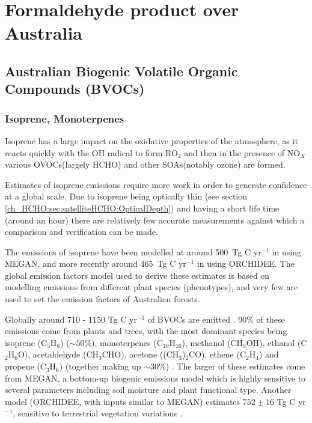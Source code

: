 
\chapter{Formaldehyde product over Australia} %
\label{ch_HCHO} %

\section{Australian Biogenic Volatile Organic Compounds (BVOCs)}
  \label{ch_HCHO:sec:bvoc}

  \subsection{Isoprene, Monoterpenes}
    
    Isoprene has a large impact on the oxidative properties of the atmosphere, as it reacts quickly with the OH radical to form RO$_2$ and then in the presence of NO$_X$ various OVOCs(largely HCHO) and other SOAs(notably ozone) are formed. 
    
    Estimates of isoprene emissions require more work in order to generate confidence at a global scale.
    Due to isoprene being optically thin (see section \ref{ch_HCHO:sec:satelliteHCHO:OpticalDepth}) and having a short life time (around an hour) there are relatively few accurate measurements against which a comparison and verification can be made.
    
    The emissions of isoprene have been modelled at around 500~Tg C yr$^{-1}$ in \citet{Guenther1995} using MEGAN, and more recently around 465~Tg C yr$^{-1}$ in \cite{Messina2016} using ORCHIDEE.
    The global emission factors model used to derive these estimates is based on modelling emissions from different plant species (phenotypes), and very few are used to set the emission factors of Australian forests.
    
    Globally around 710 - 1150 Tg C yr$^{-1}$ of BVOCs are emitted \citep{Guenther1995,Lathiere2006,Guenther2012}.
    90\% of these emissions come from plants and trees, with the most dominant species being isoprene (C$_5$H$_8$) ($\sim50\%$), monoterpenes (C$_10$H$_16$), methanol (CH$_3$OH), ethanol (C$_2$H$_6$O), acetaldehyde (CH$_3$CHO), acetone ((CH$_3$)$_2$CO), ethene (C$_2$H$_4$) and propene (C$_3$H$_6$) (together making up $\sim30\%$) \citep{Guenther2012}.
    The larger of these estimates come from MEGAN, a bottom-up biogenic emissions model which is highly sensitive to several parameters including soil moisture and plant functional type.
    Another model (ORCHIDEE, with inputs similar to MEGAN) estimates $752\pm16$ Tg C yr$^{-1}$, sensitive to terrestrial vegetation variations \citep{Lathiere2006}.
    
